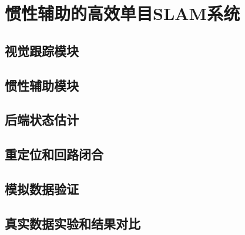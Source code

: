\chapter{惯性辅助的高效单目SLAM系统}

\section{视觉跟踪模块}

\section{惯性辅助模块}

\section{后端状态估计}

\section{重定位和回路闭合}

\section{模拟数据验证}

\section{真实数据实验和结果对比}
